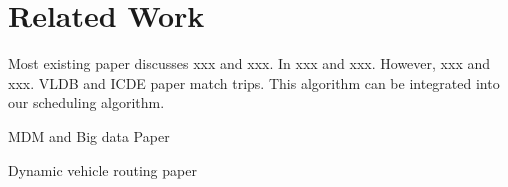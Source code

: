 \section{Related Work}
Most existing paper discusses xxx and xxx. In xxx and xxx.
However, xxx and xxx.
VLDB and ICDE paper match trips. This algorithm can be integrated into our scheduling algorithm.

MDM and Big data Paper~\cite{}

%
Dynamic vehicle routing paper~\cite{}